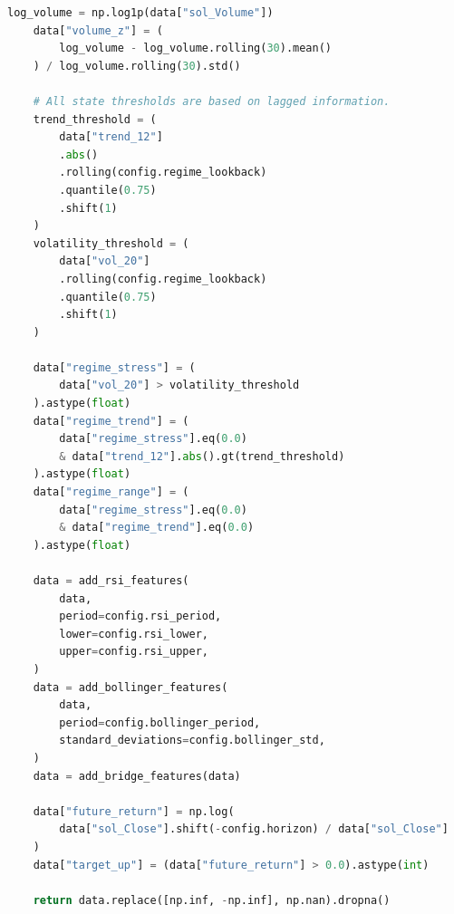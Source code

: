 \documentclass[11pt,a4paper]{report}
\begin{document}
\begin{lstlisting}[language=Python]
    log_volume = np.log1p(data["sol_Volume"])
    data["volume_z"] = (
        log_volume - log_volume.rolling(30).mean()
    ) / log_volume.rolling(30).std()

    # All state thresholds are based on lagged information.
    trend_threshold = (
        data["trend_12"]
        .abs()
        .rolling(config.regime_lookback)
        .quantile(0.75)
        .shift(1)
    )
    volatility_threshold = (
        data["vol_20"]
        .rolling(config.regime_lookback)
        .quantile(0.75)
        .shift(1)
    )

    data["regime_stress"] = (
        data["vol_20"] > volatility_threshold
    ).astype(float)
    data["regime_trend"] = (
        data["regime_stress"].eq(0.0)
        & data["trend_12"].abs().gt(trend_threshold)
    ).astype(float)
    data["regime_range"] = (
        data["regime_stress"].eq(0.0)
        & data["regime_trend"].eq(0.0)
    ).astype(float)

    data = add_rsi_features(
        data,
        period=config.rsi_period,
        lower=config.rsi_lower,
        upper=config.rsi_upper,
    )
    data = add_bollinger_features(
        data,
        period=config.bollinger_period,
        standard_deviations=config.bollinger_std,
    )
    data = add_bridge_features(data)

    data["future_return"] = np.log(
        data["sol_Close"].shift(-config.horizon) / data["sol_Close"]
    )
    data["target_up"] = (data["future_return"] > 0.0).astype(int)

    return data.replace([np.inf, -np.inf], np.nan).dropna()

\end{lstlisting}
\end{document}
